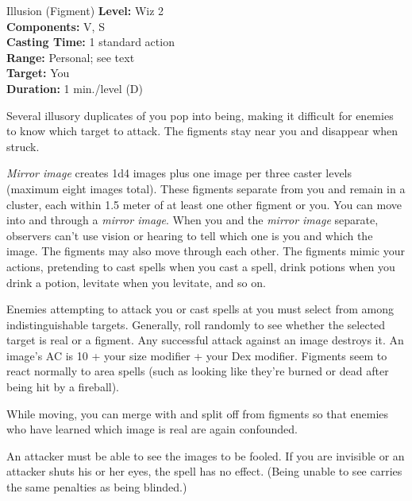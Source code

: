 {Illusion (Figment)}
{
	\textbf{Level:}
	Wiz 2\\
	\textbf{Components:}
	V, S\\
	\textbf{Casting Time:}
	1 standard action\\
	\textbf{Range:}
	Personal; see text\\
	\textbf{Target:}
	You\\
	\textbf{Duration:}
	1 min./level (D)\\
}
{
	Several illusory duplicates of you pop into being, making it difficult for enemies to know which target to attack. The figments stay near you and disappear when struck.

	\emph{Mirror image} creates 1d4 images plus one image per three caster levels (maximum eight images total). These figments separate from you and remain in a cluster, each within 1.5 meter of at least one other figment or you. You can move into and through a \emph{mirror image}. When you and the \emph{mirror image} separate, observers can't use vision or hearing to tell which one is you and which the image. The figments may also move through each other. The figments mimic your actions, pretending to cast spells when you cast a spell, drink potions when you drink a potion, levitate when you levitate, and so on.

	Enemies attempting to attack you or cast spells at you must select from among indistinguishable targets. Generally, roll randomly to see whether the selected target is real or a figment. Any successful attack against an image destroys it. An image's AC is 10 + your size modifier + your Dex modifier. Figments seem to react normally to area spells (such as looking like they're burned or dead after being hit by a fireball).

	While moving, you can merge with and split off from figments so that enemies who have learned which image is real are again confounded.

	An attacker must be able to see the images to be fooled. If you are invisible or an attacker shuts his or her eyes, the spell has no effect. (Being unable to see carries the same penalties as being blinded.)

}
